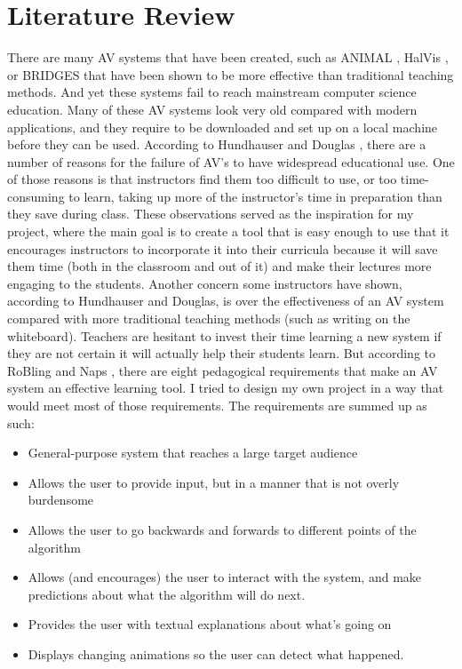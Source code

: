 \chapter{Literature Review}
\label{literature-review}
There are many AV systems that have been created, such as 
ANIMAL \cite{h}, HalVis \cite{i}, or BRIDGES \cite{g} that 
have been shown to be more effective than traditional teaching methods. 
And yet these systems fail to reach mainstream computer science education. 
\newline\newline
Many of these AV systems look very old compared with modern applications, 
and they require to be downloaded and set up on a local machine before 
they can be used.
According to Hundhauser and Douglas \cite{j}, 
there are a number of reasons for the failure of 
AV's to have widespread educational use.
One of those reasons is that instructors find them too difficult to use, 
or too time-consuming to learn, 
taking up more of the instructor's time 
in preparation than they save during class. 
\newline\newline
These observations served as the inspiration for my project, 
where the main goal is to create a tool that is easy enough to use
that it encourages instructors to incorporate it into their curricula
because it will save them time (both in the classroom and out of it) 
and make their lectures more engaging to the students. 
\newline\newline
Another concern some instructors have shown, according to Hundhauser and Douglas,
is over the effectiveness of 
an AV system compared with more traditional teaching methods 
(such as writing on the whiteboard). 
Teachers are hesitant to invest their time learning a new system 
if they are not certain it will actually help their students learn.
But according to RoBling and Naps \cite{f}, there are eight 
pedagogical requirements that make an AV system an effective learning tool.
I tried to design my own project in a way that 
would meet most of those requirements. 
The requirements are summed up as such: 
\begin{itemize}
	\item General-purpose system that reaches a large target audience
	\item Allows the user to provide input, but in a manner that is not overly burdensome
	\item Allows the user to go backwards and forwards to different points of the 
	algorithm
	\item Allows (and encourages) the user to interact with the system, and make
	predictions about what the algorithm will do next. 
	\item Provides the user with textual explanations about what's going on
	\item Displays changing animations so the user can detect what happened. 
\end{itemize}